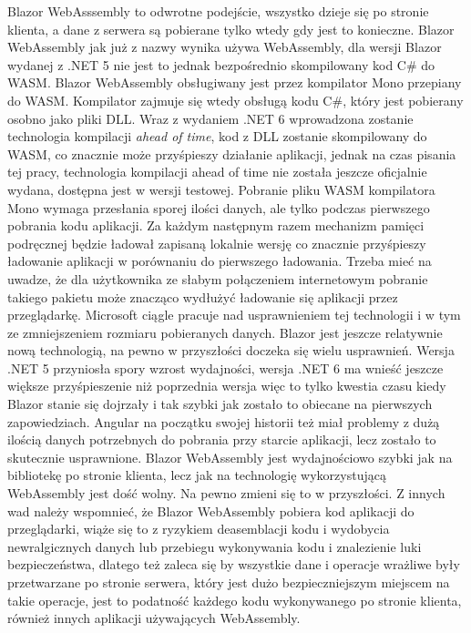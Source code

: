 \documentclass[12pt,a4paper,oneside]{book}
\begin{document}
Blazor WebAsssembly to odwrotne podejście, wszystko dzieje się po stronie klienta, a dane z serwera są pobierane tylko wtedy gdy jest to konieczne. Blazor WebAssembly jak już z nazwy wynika używa WebAssembly, dla wersji Blazor wydanej z .NET 5 nie jest to jednak bezpośrednio skompilowany kod C\# do WASM. Blazor WebAssembly obsługiwany jest przez kompilator Mono przepiany do WASM. Kompilator zajmuje się wtedy obsługą kodu C\#, który jest pobierany osobno jako pliki DLL. Wraz z wydaniem .NET 6 wprowadzona zostanie technologia kompilacji \textit{ahead of time}, kod z DLL zostanie skompilowany do WASM, co znacznie może przyśpieszy działanie aplikacji, jednak na czas pisania tej pracy, technologia kompilacji ahead of time nie została jeszcze oficjalnie wydana, dostępna jest w wersji testowej. Pobranie pliku WASM kompilatora Mono wymaga przesłania sporej ilości danych, ale tylko podczas pierwszego pobrania kodu aplikacji. Za każdym następnym razem mechanizm pamięci podręcznej będzie ładował zapisaną lokalnie wersję co znacznie przyśpieszy ładowanie aplikacji w porównaniu do pierwszego ładowania. Trzeba mieć na uwadze, że dla użytkownika ze słabym połączeniem internetowym pobranie takiego pakietu może znacząco wydłużyć ładowanie się aplikacji przez przeglądarkę. Microsoft ciągle pracuje nad usprawnieniem tej technologii i w tym ze zmniejszeniem rozmiaru pobieranych danych. Blazor jest jeszcze relatywnie nową technologią, na pewno w przyszłości doczeka się wielu usprawnień. Wersja .NET 5 przyniosła spory wzrost wydajności, wersja .NET 6 ma wnieść jeszcze większe przyśpieszenie niż poprzednia wersja więc to tylko kwestia czasu kiedy Blazor stanie się dojrzały i tak szybki jak zostało to obiecane na pierwszych zapowiedziach. Angular na początku swojej historii też miał problemy z dużą ilością danych potrzebnych do pobrania przy starcie aplikacji, lecz zostało to skutecznie usprawnione. Blazor WebAssembly jest wydajnościowo szybki jak na bibliotekę po stronie klienta, lecz jak na technologię wykorzystującą WebAssembly jest dość wolny. Na pewno zmieni się to w przyszłości. Z innych wad należy wspomnieć, że Blazor WebAssembly pobiera kod aplikacji do przeglądarki, wiąże się to z ryzykiem deasemblacji kodu i wydobycia newralgicznych danych lub przebiegu wykonywania kodu i znalezienie luki bezpieczeństwa, dlatego też zaleca się by wszystkie dane i operacje wrażliwe były przetwarzane po stronie serwera, który jest dużo bezpieczniejszym miejscem na takie operacje, jest to podatność każdego kodu wykonywanego po stronie klienta, również innych aplikacji używających WebAssembly.
\end{document}
